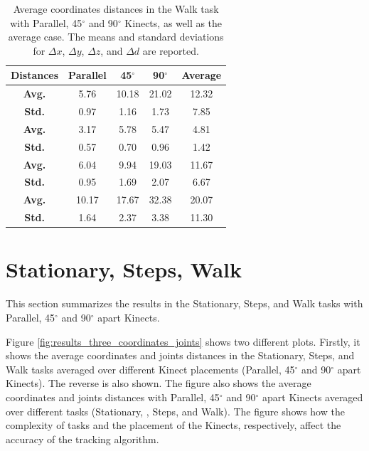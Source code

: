 \begin{table}[!h]
  \centering

  \begin{tabulary}{1.0\linewidth}{||c c c c c||} 
   \hline
   \textbf{Distances} & \textbf{Parallel} & \textbf{45$^{\circ}$} & \textbf{90$^{\circ}$} & \textbf{Average} \\ [0.5ex] 
   \hline\hline
   \textbf{Avg.}  & 5.76 & 10.18 & 21.02 & 12.32 \\
   \hline
   \textbf{Std.}  & 0.97 & 1.16 & 1.73 & 7.85 \\
   \hline
   \textbf{Avg.}  & 3.17 & 5.78 & 5.47 & 4.81 \\
   \hline
   \textbf{Std.}  & 0.57 & 0.70 & 0.96 & 1.42 \\
   \hline
   \textbf{Avg.}  & 6.04 & 9.94 & 19.03 & 11.67 \\
   \hline
   \textbf{Std.}  & 0.95 & 1.69 & 2.07 & 6.67 \\
   \hline
   \textbf{Avg.}  & 10.17 & 17.67 & 32.38 & 20.07 \\
   \hline
   \textbf{Std.}  & 1.64 & 2.37 & 3.38 & 11.30 \\
   \hline
  \end{tabulary}

  \caption{Average coordinates distances in the Walk task with Parallel, 45$^{\circ}$ and 90$^{\circ}$ Kinects, as well as the average case. The means and standard deviations for $\Delta x$, $\Delta y$, $\Delta z$, and $\Delta d$ are reported.}
  
  \label{table:walk_coordinates_values}
\end{table}

% 
% 
\section{Stationary, Steps, Walk}
\label{sec:results_stationary_steps_walk}

This section summarizes the results in the Stationary, Steps, and Walk tasks with Parallel, 45$^{\circ}$ and 90$^{\circ}$ apart Kinects.

Figure \ref{fig:results_three_coordinates_joints} shows two different plots. Firstly, it shows the average coordinates and joints distances in the Stationary, Steps, and Walk tasks averaged over different Kinect placements (Parallel, 45$^{\circ}$ and 90$^{\circ}$ apart Kinects). The reverse is also shown. The figure also shows the average coordinates and joints distances with Parallel, 45$^{\circ}$ and 90$^{\circ}$ apart Kinects averaged over different tasks (Stationary, , Steps, and Walk). The figure shows how the complexity of tasks and the placement of the Kinects, respectively, affect the accuracy of the tracking algorithm.

